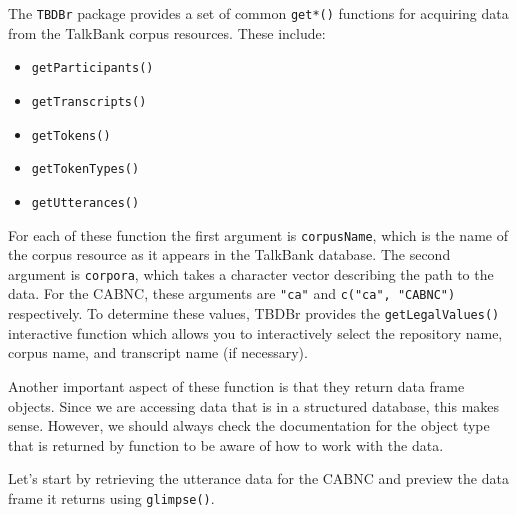 \documentclass[
  letterpaper,
  DIV=11,
  numbers=noendperiod]{scrreport}
\providecommand{\tightlist}{%
  \setlength{\itemsep}{0pt}\setlength{\parskip}{0pt}}\usepackage{longtable,booktabs,array}
\theoremstyle{definition}
\theoremstyle{remark}
\begin{document}
The \texttt{TBDBr} package provides a set of common \texttt{get*()}
functions for acquiring data from the TalkBank corpus resources. These
include:

\begin{itemize}
\tightlist
\item
  \texttt{getParticipants()}
\item
  \texttt{getTranscripts()}
\item
  \texttt{getTokens()}
\item
  \texttt{getTokenTypes()}
\item
  \texttt{getUtterances()}
\end{itemize}

For each of these function the first argument is \texttt{corpusName},
which is the name of the corpus resource as it appears in the TalkBank
database. The second argument is \texttt{corpora}, which takes a
character vector describing the path to the data. For the CABNC, these
arguments are \texttt{"ca"} and \texttt{c("ca",\ "CABNC")} respectively.
To determine these values, TBDBr provides the \texttt{getLegalValues()}
interactive function which allows you to interactively select the
repository name, corpus name, and transcript name (if necessary).

Another important aspect of these function is that they return data
frame objects. Since we are accessing data that is in a structured
database, this makes sense. However, we should always check the
documentation for the object type that is returned by function to be
aware of how to work with the data.

Let's start by retrieving the utterance data for the CABNC and preview
the data frame it returns using \texttt{glimpse()}.
\end{document}
